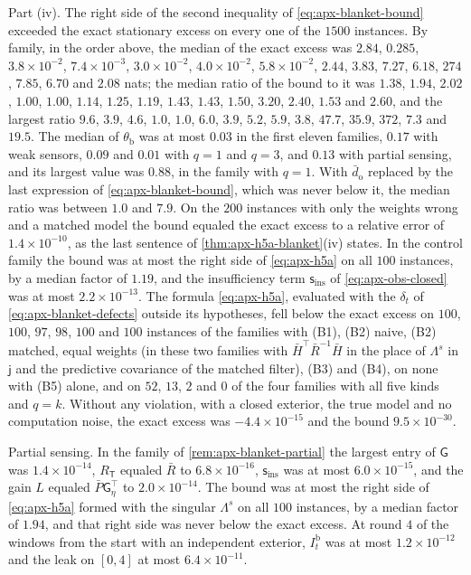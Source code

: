 \begin{numcheck}
Part (iv). The right side of the second inequality of \eqref{eq:apx-blanket-bound} exceeded the exact stationary excess on every one of the $1500$ instances. By family, in the order above, the median of the exact excess was $2.84$, $0.285$, $3.8\times10^{-2}$, $7.4\times10^{-3}$, $3.0\times10^{-2}$, $4.0\times10^{-2}$, $5.8\times10^{-2}$, $2.44$, $3.83$, $7.27$, $6.18$, $274$, $7.85$, $6.70$ and $2.08$ nats; the median ratio of the bound to it was $1.38$, $1.94$, $2.02$, $1.00$, $1.00$, $1.14$, $1.25$, $1.19$, $1.43$, $1.43$, $1.50$, $3.20$, $2.40$, $1.53$ and $2.60$, and the largest ratio $9.6$, $3.9$, $4.6$, $1.0$, $1.0$, $6.0$, $3.9$, $5.2$, $5.9$, $3.8$, $47.7$, $35.9$, $372$, $7.3$ and $19.5$. The median of $\theta_{\mathrm b}$ was at most $0.03$ in the first eleven families, $0.17$ with weak sensors, $0.09$ and $0.01$ with $q=1$ and $q=3$, and $0.13$ with partial sensing, and its largest value was $0.88$, in the family with $q=1$. With $\bar d_{\mathrm o}$ replaced by the last expression of \eqref{eq:apx-blanket-bound}, which was never below it, the median ratio was between $1.0$ and $7.9$. On the $200$ instances with only the weights wrong and a matched model the bound equaled the exact excess to a relative error of $1.4\times10^{-10}$, as the last sentence of \cref{thm:apx-h5a-blanket}(iv) states. In the control family the bound was at most the right side of \eqref{eq:apx-h5a} on all $100$ instances, by a median factor of $1.19$, and the insufficiency term $\mathsf s_{\mathrm{ins}}$ of \eqref{eq:apx-obs-closed} was at most $2.2\times10^{-13}$. The formula \eqref{eq:apx-h5a}, evaluated with the $\delta_t$ of \eqref{eq:apx-blanket-defects} outside its hypotheses, fell below the exact excess on $100$, $100$, $97$, $98$, $100$ and $100$ instances of the families with (B1), (B2) naive, (B2) matched, equal weights (in these two families with $\bar H^\top\bar R^{-1}\bar H$ in the place of $\Lambda^s$ in $\mathsf j$ and the predictive covariance of the matched filter), (B3) and (B4), on none with (B5) alone, and on $52$, $13$, $2$ and $0$ of the four families with all five kinds and $q=k$. Without any violation, with a closed exterior, the true model and no computation noise, the exact excess was $-4.4\times10^{-15}$ and the bound $9.5\times10^{-30}$.

Partial sensing. In the family of \cref{rem:apx-blanket-partial} the largest entry of $\mathsf G$ was $1.4\times10^{-14}$, $R_{\mathsf T}$ equaled $\bar R$ to $6.8\times10^{-16}$, $\mathsf s_{\mathrm{ins}}$ was at most $6.0\times10^{-15}$, and the gain $L$ equaled $\bar P\mathsf G_\eta^\top$ to $2.0\times10^{-14}$. The bound was at most the right side of \eqref{eq:apx-h5a} formed with the singular $\Lambda^s$ on all $100$ instances, by a median factor of $1.94$, and that right side was never below the exact excess. At round $4$ of the windows from the start with an independent exterior, $I^{\mathrm b}_t$ was at most $1.2\times10^{-12}$ and the leak on $[0,4]$ at most $6.4\times10^{-11}$.


\end{numcheck}
